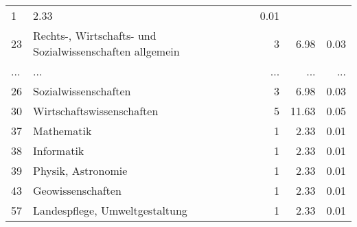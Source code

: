 \begin{longtable}{lXrrr}
          \num{1} &
          \num[round-mode=places,round-precision=2]{2,33} &
          \num[round-mode=places,round-precision=2]{0,01} \\
        23 & \multicolumn{1}{X}{Rechts-, Wirtschafts- und Sozialwissenschaften allgemein} & %
          \num{3} &
          \num[round-mode=places,round-precision=2]{6,98} &
          \num[round-mode=places,round-precision=2]{0,03} \\
       ... & ... & ... & ... & ... \\
        26 & \multicolumn{1}{X}{Sozialwissenschaften} & %
          \num{3} &
          \num[round-mode=places,round-precision=2]{6,98} &
          \num[round-mode=places,round-precision=2]{0,03} \\

        30 & \multicolumn{1}{X}{Wirtschaftswissenschaften} & %
          \num{5} &
          \num[round-mode=places,round-precision=2]{11,63} &
          \num[round-mode=places,round-precision=2]{0,05} \\

        37 & \multicolumn{1}{X}{Mathematik} & %
          \num{1} &
          \num[round-mode=places,round-precision=2]{2,33} &
          \num[round-mode=places,round-precision=2]{0,01} \\

        38 & \multicolumn{1}{X}{Informatik} & %
          \num{1} &
          \num[round-mode=places,round-precision=2]{2,33} &
          \num[round-mode=places,round-precision=2]{0,01} \\

        39 & \multicolumn{1}{X}{Physik, Astronomie} & %
          \num{1} &
          \num[round-mode=places,round-precision=2]{2,33} &
          \num[round-mode=places,round-precision=2]{0,01} \\

        43 & \multicolumn{1}{X}{Geowissenschaften} & %
          \num{1} &
          \num[round-mode=places,round-precision=2]{2,33} &
          \num[round-mode=places,round-precision=2]{0,01} \\

        57 & \multicolumn{1}{X}{Landespflege, Umweltgestaltung} & %
          \num{1} &
          \num[round-mode=places,round-precision=2]{2,33} &
          \num[round-mode=places,round-precision=2]{0,01} \\


\end{longtable}
